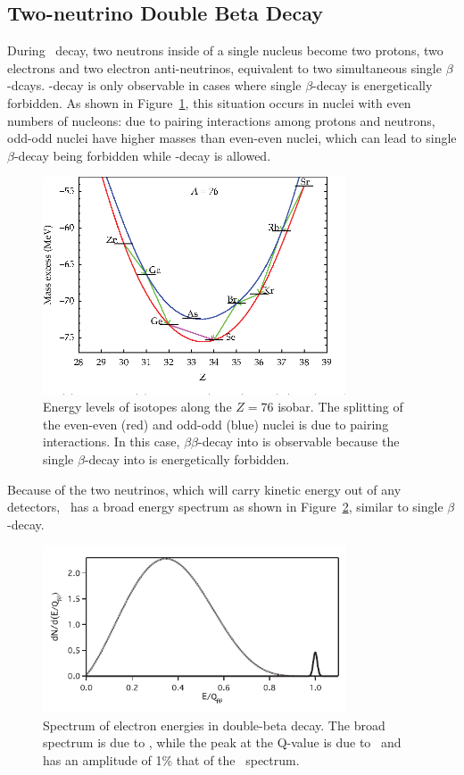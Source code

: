 \documentclass[/main.tex]{subfiles}
\begin{document}
\subsection{Two-neutrino Double Beta Decay}
During \tnbb\ decay, two neutrons inside of a single nucleus become two protons, two electrons and two electron anti-neutrinos, equivalent to two simultaneous single $\beta$-dcays.
\bb -decay is only observable in cases where single $\beta$-decay is energetically forbidden.
As shown in Figure~\ref{fig:bballowed}, this situation occurs in nuclei with even numbers of nucleons: due to pairing interactions among protons and neutrons, odd-odd nuclei have higher masses than even-even nuclei, which can lead to single $\beta$-decay being forbidden while \bb -decay is allowed.
\begin{figure}[t]
  \centering
  \includegraphics[width=0.8\textwidth]{bballowed}
  \caption[Allowed $\beta\beta$ Isobar]{\label{fig:bballowed}
    Energy levels of isotopes along the $Z=76$ isobar. The splitting of the even-even (red) and odd-odd (blue) nuclei is due to pairing interactions. In this case,  $\beta\beta$-decay into  is observable because the single $\beta$-decay into  is energetically forbidden.
  }
\end{figure}
Because of the two neutrinos, which will carry kinetic energy out of any detectors, \tnbb\ has a broad energy spectrum as shown in Figure~\ref{fig:bbspectrum}, similar to single $\beta$-decay.
\begin{figure}[t]
  \centering
  \includegraphics[width=0.8\textwidth]{bbSpectrum}
  \caption[Energy Spectrum of \tnbb\ and \znbb]{\label{fig:bbspectrum}
    Spectrum of electron energies in double-beta decay. The broad spectrum is due to \tnbb, while the peak at the Q-value is due to \znbb\ and has an amplitude of 1\% that of the \tnbb\ spectrum.
  }
\end{figure}
\end{document}
